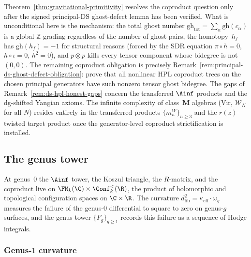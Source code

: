 \begin{remark}
\label{rem:primitivity-scope}
\label{rem:coproduct-gap-closed}
Theorem~\ref{thm:gravitational-primitivity} resolves the coproduct
question only after the signed principal-DS ghost-defect lemma has
been verified. What is unconditional here is the mechanism: the total
ghost number
$\mathrm{gh}_{\mathrm{tot}} = \sum_\alpha \mathrm{gh}(c_\alpha)$
is a global $\mathbb{Z}$-grading regardless of the number of ghost
pairs, the homotopy~$h_f$ has $\mathrm{gh}(h_f) = -1$ for
structural reasons (forced by the SDR equation
$\pi \circ h = 0$, $h \circ \iota = 0$, $h^2 = 0$),
and $p \otimes p$ kills every tensor component whose bidegree is not
\((0,0)\). The remaining coproduct obligation is precisely
Remark~\ref{rem:principal-ds-ghost-defect-obligation}: prove that all
nonlinear HPL coproduct trees on the chosen principal generators have
such nonzero tensor ghost bidegree. The gaps of
Remark~\ref{rem:ds-hpl-honest-gaps} concern the transferred
\(\Ainf\) products and the dg-shifted Yangian axioms. The infinite
complexity of
class~$\mathbf{M}$ algebras ($\mathrm{Vir}$,
$\mathcal{W}_N$ for all $N$) resides entirely in the
transferred products $\{m_n^W\}_{n \ge 3}$ and the
$r(z)$-twisted target product once the generator-level coproduct
strictification is installed.
\end{remark}


\subsection{The genus tower}
\label{subsec:gravity-genus-tower}

At genus~$0$ the $\Ainf$ tower, the Koszul triangle, the
$R$-matrix, and the coproduct live on
$\FM_k(\C) \times \Conf_k^<(\R)$, the product of holomorphic
and topological configuration spaces on $\C \times \R$. The
curvature $d_{\mathrm{fib}}^2 = \kappa_{\mathrm{eff}}
\cdot \omega_g$ measures the failure of the genus-$0$
differential to square to zero on genus-$g$ surfaces,
and the genus tower $\{F_g\}_{g \ge 1}$ records this
failure as a sequence of Hodge integrals.

\subsubsection*{Genus-$1$ curvature}


